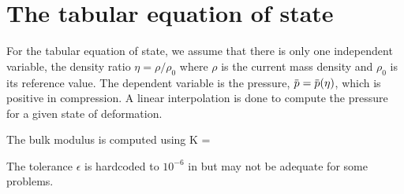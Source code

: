 \section{The tabular equation of state}
For the tabular equation of state, we assume that there is only one independent variable,
the density ratio $\eta = \rho/\rho_0$ where $\rho$ is the current mass density and $\rho_0$ is
its reference value.  The dependent variable is the pressure, $\pbar = \pbar(\eta)$, which is
positive in compression.  A linear interpolation is done to compute the pressure
for a given state of deformation.

The bulk modulus is computed using
\Beq
  K = \rho {}
\Eeq
\begin{WarningBox}
The tolerance $\epsilon$ is hardcoded to $10^{-6}$ in \Vaango but
may not be adequate for some problems.
\end{WarningBox}

